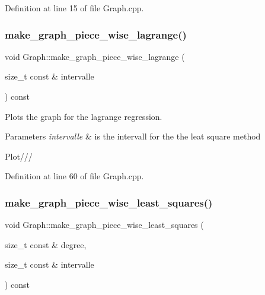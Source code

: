 Definition at line 15 of file Graph.\+cpp.

\mbox{\label{class_graph_a3206cf8103554c4c84f20abc96a1413c}} 
\subsubsection{\texorpdfstring{make\+\_\+graph\+\_\+piece\+\_\+wise\+\_\+lagrange()}{make\_graph\_piece\_wise\_lagrange()}}
{\footnotesize\ttfamily void Graph\+::make\+\_\+graph\+\_\+piece\+\_\+wise\+\_\+lagrange (\begin{DoxyParamCaption}\item[{size\+\_\+t const \&}]{intervalle }\end{DoxyParamCaption}) const}



Plots the graph for the lagrange regression. 


\begin{DoxyParams}{Parameters}
{\em intervalle} & is the intervall for the the leat square method \\
\hline
\end{DoxyParams}
Plot/// 

Definition at line 60 of file Graph.\+cpp.

\mbox{\label{class_graph_ab4a370a88a1041561e0788817eccd142}} 
\subsubsection{\texorpdfstring{make\+\_\+graph\+\_\+piece\+\_\+wise\+\_\+least\+\_\+squares()}{make\_graph\_piece\_wise\_least\_squares()}}
{\footnotesize\ttfamily void Graph\+::make\+\_\+graph\+\_\+piece\+\_\+wise\+\_\+least\+\_\+squares (\begin{DoxyParamCaption}\item[{size\+\_\+t const \&}]{degree,  }\item[{size\+\_\+t const \&}]{intervalle }\end{DoxyParamCaption}) const}



